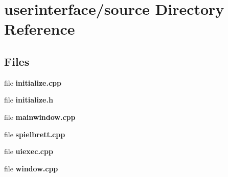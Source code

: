 \section{userinterface/source Directory Reference}
\label{dir_aa846e172099aaf5cdbfee6208ed5417}
\subsection*{Files}
\begin{DoxyCompactItemize}
\item 
file {\bfseries initialize.\-cpp}
\item 
file {\bfseries initialize.\-h}
\item 
file {\bfseries mainwindow.\-cpp}
\item 
file {\bfseries spielbrett.\-cpp}
\item 
file {\bfseries uiexec.\-cpp}
\item 
file {\bfseries window.\-cpp}
\end{DoxyCompactItemize}
